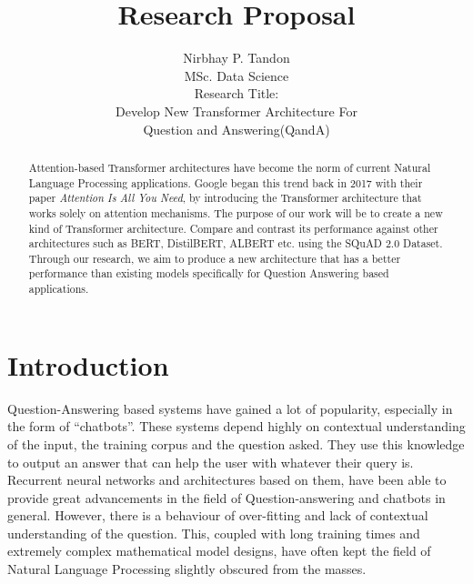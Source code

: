 \documentclass[11pt]{article}
\begin{document}
	\title{Research Proposal}

	\author{Nirbhay P. Tandon\\MSc. Data Science\\
		Research Title:\\Develop New Transformer Architecture For \\ Question and Answering(QandA)
	}
	\date{}
\clearpage \maketitle
\thispagestyle{empty}

	\newpage
	\begin{abstract}
		Attention-based Transformer architectures have become the norm of current Natural Language Processing applications. Google began this trend back in 2017 with their paper \textit{Attention Is All You Need}, by introducing the Transformer architecture that works solely on attention mechanisms. The purpose of our work will be to create a new kind of Transformer architecture. Compare and contrast its performance against other architectures such as BERT, DistilBERT, ALBERT etc. using the SQuAD 2.0 Dataset. Through our research, we aim to produce a new architecture that has a better performance than existing models specifically for Question Answering based applications.
	\end{abstract}
	\newpage
	\tableofcontents
  \cleardoublepage
{}
	\let\oldnumberline\numberline%
\renewcommand{\numberline}{\figurename~\oldnumberline}
\listoffigures
	\newpage

	\newpage
	\section{Introduction}\label{introduction}

	Question-Answering based systems have gained a lot of popularity, especially in the form of ``chatbots''. These systems depend highly on contextual understanding of the input, the training corpus and the question asked. They use this knowledge to output an answer that can help the user with whatever their query is. Recurrent neural networks and architectures based on them, have been able to provide great advancements in the field of Question-answering and chatbots in general. However, there is a behaviour of over-fitting and lack of contextual understanding of the question. This, coupled with long training times and extremely complex mathematical model designs, have often kept the field of Natural Language Processing slightly obscured from the masses.
\end{document}
